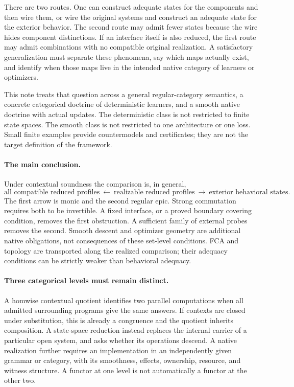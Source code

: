 \documentclass[11pt]{article}
\theoremstyle{definition}
\theoremstyle{remark}\newtheorem{remark}[theorem]{Remark}
\begin{document}
There are two routes. One can construct adequate states for the components
and then wire them, or wire the original systems and construct an adequate
state for the exterior behavior. The second route may admit fewer states
because the wire hides component distinctions. If an interface itself is
also reduced, the first route may admit combinations with no compatible
original realization. A satisfactory generalization must separate these
phenomena, say which maps actually exist, and identify when those maps live
in the intended native category of learners or optimizers.

This note treats that question across a general regular-category semantics,
a concrete categorical doctrine of deterministic learners, and a smooth
native doctrine with actual updates. The deterministic class is not restricted
to finite state spaces. The smooth class is not restricted to one architecture
or one loss. Small finite examples provide countermodels and certificates;
they are not the target definition of the framework.

\paragraph{The main conclusion.}
Under contextual soundness the comparison is, in general,
\[
 \text{all compatible reduced profiles}
 \ \longleftarrow\ \text{realizable reduced profiles}
 \ \longrightarrow\ \text{exterior behavioral states}.
\]
The first arrow is monic and the second regular epic. Strong commutation
requires both to be invertible. A fixed interface, or a proved boundary
covering condition, removes the first obstruction. A sufficient family of
external probes removes the second. Smooth descent and optimizer geometry
are additional native obligations, not consequences of these set-level
conditions. FCA and topology are transported along the realized comparison;
their adequacy conditions can be strictly weaker than behavioral adequacy.

\paragraph{Three categorical levels must remain distinct.}
A homwise contextual quotient identifies two parallel computations when all
admitted surrounding programs give the same answers. If contexts are closed
under substitution, this is already a congruence and the quotient inherits
composition. A state-space reduction instead replaces the internal carrier
of a particular open system, and asks whether its operations descend.
A native realization further requires an implementation in an independently
given grammar or category, with its smoothness, effects, ownership, resource,
and witness structure. A functor at one level is not automatically a
functor at the other two.
\end{document}
